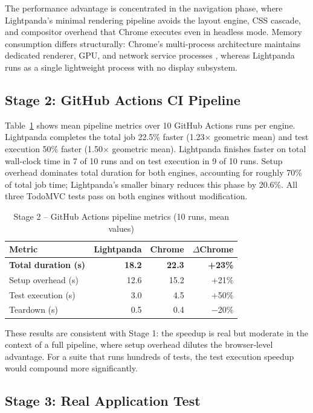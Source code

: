 The performance advantage is concentrated in the navigation phase, where Lightpanda's minimal rendering pipeline avoids the layout engine, CSS cascade, and compositor overhead that Chrome executes even in headless mode. Memory consumption differs structurally: Chrome's multi-process architecture maintains dedicated renderer, GPU, and network service processes \cite{reis2009isolating}, whereas Lightpanda runs as a single lightweight process with no display subsystem.

\subsection{Stage 2: GitHub Actions CI Pipeline}

Table~\ref{tab:pipeline} shows mean pipeline metrics over 10 GitHub Actions runs per engine. Lightpanda completes the total job 22.5\% faster (1.23$\times$ geometric mean) and test execution 50\% faster (1.50$\times$ geometric mean). Lightpanda finishes faster on total wall-clock time in 7 of 10 runs and on test execution in 9 of 10 runs. Setup overhead dominates total duration for both engines, accounting for roughly 70\% of total job time; Lightpanda's smaller binary reduces this phase by 20.6\%. All three TodoMVC tests pass on both engines without modification.

\begin{table}[t]
\centering
\caption{Stage 2 -- GitHub Actions pipeline metrics (10 runs, mean values)}
\label{tab:pipeline}
\begin{tabular}{lrrr}
\toprule
\textbf{Metric} & \textbf{Lightpanda} & \textbf{Chrome} & \textbf{$\Delta$Chrome} \\
\midrule
\textbf{Total duration (s)}  & \textbf{18.2} & \textbf{22.3} & \textbf{+23\%} \\
Setup overhead (s)  & 12.6 & 15.2 & +21\% \\
Test execution (s)  & 3.0  & 4.5  & +50\% \\
Teardown (s)        & 0.5  & 0.4  & $-$20\% \\
\bottomrule
\end{tabular}
\end{table}

These results are consistent with Stage 1: the speedup is real but moderate in the context of a full pipeline, where setup overhead dilutes the browser-level advantage. For a suite that runs hundreds of tests, the test execution speedup would compound more significantly.

\subsection{Stage 3: Real Application Test}

